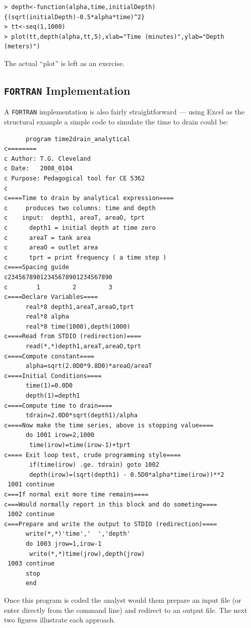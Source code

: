 \documentclass[12pt]{article}
\begin{document}
\begin{verbatim}
> depth<-function(alpha,time,initialDepth){(sqrt(initialDepth)-0.5*alpha*time)^2}
> tt<-seq(1,1000)
> plot(tt,depth(alpha,tt,5),xlab="Time (minutes)",ylab="Depth (meters)")
\end{verbatim}

The actual ``plot'' is left as an exercise. 

\subsection{\texttt{FORTRAN} Implementation}
A \texttt{FORTRAN} implementation is also fairly straightforward --- using Excel as the structural example a simple code to simulate the time to drain could be:

\begin{verbatim}
      program time2drain_analytical
c========
c Author: T.G. Cleveland
c Date:   2008_0104
c Purpose: Pedagogical tool for CE 5362
c
c====Time to drain by analytical expression====
c     produces two columns: time and depth
c    input:  depth1, areaT, areaO, tprt
c      depth1 = initial depth at time zero
c      areaT = tank area
c      areaO = outlet area
c      tprt = print frequency ( a time step )
c====Spacing guide
c23456789012345678901234567890
c        1         2         3
c====Declare Variables====
      real*8 depth1,areaT,areaO,tprt
      real*8 alpha
      real*8 time(1000),depth(1000)
c====Read from STDIO (redirection)====
      read(*,*)depth1,areaT,areaO,tprt
c====Compute constant====
      alpha=sqrt(2.0D0*9.8D0)*areaO/areaT
c====Initial Conditions====
      time(1)=0.0D0
      depth(1)=depth1
c====Compute time to drain====
      tdrain=2.0D0*sqrt(depth1)/alpha
c====Now make the time series, above is stopping value====
      do 1001 irow=2,1000
	   time(irow)=time(irow-1)+tprt
c==== Exit loop test, crude programming style====
	   if(time(irow) .ge. tdrain) goto 1002
	   depth(irow)=(sqrt(depth1) - 0.5D0*alpha*time(irow))**2
 1001 continue
c===If normal exit more time remains====
c===Would normally report in this block and do someting====
 1002 continue
c===Prepare and write the output to STDIO (redirection)====
      write(*,*)'time','  ','depth'
      do 1003 jrow=1,irow-1
       write(*,*)time(jrow),depth(jrow)
 1003 continue
      stop
      end
\end{verbatim}

Once this program is coded the analyst would them prepare an input file (or enter directly from the command line) and redirect to an output file.  The next two figures illustrate each approach.
\end{document}
